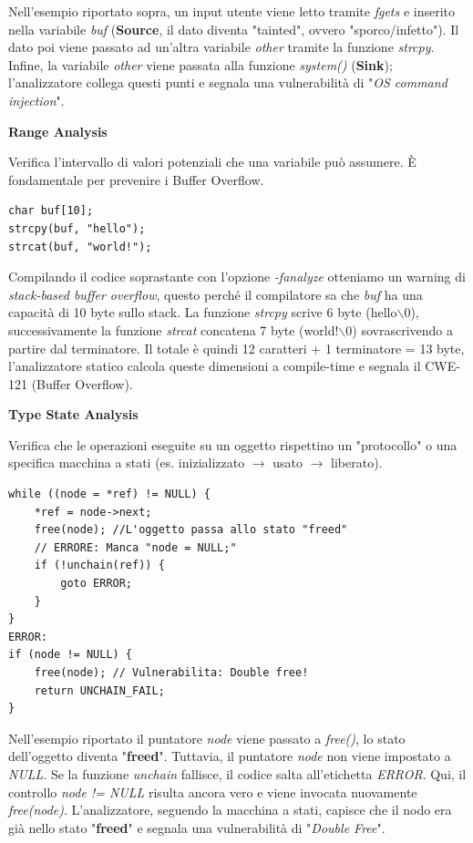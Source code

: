 Nell'esempio riportato sopra, un input utente viene letto tramite \textit{fgets} e 
inserito nella variabile \textit{buf} (\textbf{Source}, il dato diventa "tainted", 
ovvero "sporco/infetto"). Il dato poi viene passato ad un'altra variabile \textit{other}
tramite la funzione \textit{strcpy}. Infine, la variabile \textit{other} viene passata
alla funzione \textit{system()} (\textbf{Sink}); l'analizzatore collega questi punti 
e segnala una vulnerabilità di "\textit{OS command injection}".

\textbf{Range Analysis}

Verifica l'intervallo di valori potenziali che una variabile può assumere. È 
fondamentale per prevenire i Buffer Overflow.

\begin{lstlisting}
char buf[10];
strcpy(buf, "hello");
strcat(buf, "world!");
\end{lstlisting}

Compilando il codice soprastante con l'opzione \textit{-fanalyze} otteniamo un warning
di \textit{stack-based buffer overflow}, questo perché il compilatore sa che \textit{buf} ha 
una capacità di 10 byte sullo stack. La funzione \textit{strcpy} scrive 6 byte (hello$\backslash$0),
successivamente la funzione \textit{strcat} concatena 7 byte (world!$\backslash$0)
sovrascrivendo a partire dal terminatore. Il totale è quindi 12 caratteri + 1 terminatore 
= 13 byte, l'analizzatore statico calcola queste dimensioni a compile-time e segnala 
il CWE-121 (Buffer Overflow).

\textbf{Type State Analysis}

Verifica che le operazioni eseguite su un oggetto rispettino un "protocollo" o una 
specifica macchina a stati (es. inizializzato $\rightarrow$ usato $\rightarrow$ liberato).

\begin{lstlisting}
while ((node = *ref) != NULL) {
    *ref = node->next;
    free(node); //L'oggetto passa allo stato "freed"
    // ERRORE: Manca "node = NULL;"
    if (!unchain(ref)) {
        goto ERROR;
    }
}
ERROR:
if (node != NULL) {
    free(node); // Vulnerabilita: Double free!
    return UNCHAIN_FAIL;
}
\end{lstlisting}

Nell'esempio riportato il puntatore \textit{node} viene passato a \textit{free()}, lo 
stato dell'oggetto diventa "\textbf{freed}". Tuttavia, il puntatore \textit{node} non 
viene impostato a \textit{NULL}. Se la funzione \textit{unchain} fallisce, il codice 
salta all'etichetta \textit{ERROR}. Qui, il controllo \textit{node != NULL} risulta 
ancora vero e viene invocata nuovamente \textit{free(node)}. L'analizzatore, seguendo 
la macchina a stati, capisce che il nodo era già nello stato "\textbf{freed}" e segnala una 
vulnerabilità di "\textit{Double Free}".

